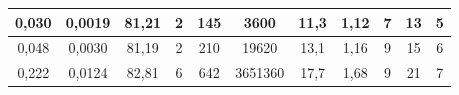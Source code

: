 \begin{sidewaystable}[]
\begin{tabular}{|c|c|c|c|c|ccccc|c|}
    0,030                                                                   & 0,0019                                                                 & 81,21                                                                & 2                                                               & 145                                                             & \multicolumn{1}{c|}{3600}                                                            & \multicolumn{1}{c|}{11,3}                                                                    & \multicolumn{1}{c|}{1,12}                                                                 & \multicolumn{1}{c|}{7}                                                                     & 13                                                                    & 5                                                              \\ \hline
    0,048                                                                   & 0,0030                                                                 & 81,19                                                                & 2                                                               & 210                                                             & \multicolumn{1}{c|}{19620}                                                           & \multicolumn{1}{c|}{13,1}                                                                    & \multicolumn{1}{c|}{1,16}                                                                 & \multicolumn{1}{c|}{9}                                                                     & 15                                                                    & 6                                                              \\ \hline
    0,222                                                                   & 0,0124                                                                 & 82,81                                                                & 6                                                               & 642                                                             & \multicolumn{1}{c|}{3651360}                                                         & \multicolumn{1}{c|}{17,7}                                                                    & \multicolumn{1}{c|}{1,68}                                                                 & \multicolumn{1}{c|}{9}                                                                     & 21                                                                    & 7                                                              \\ \hline

\end{tabular}
\end{sidewaystable}
